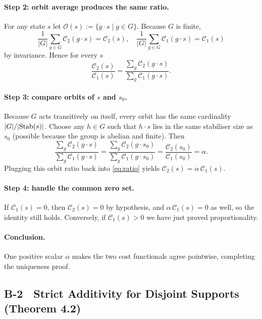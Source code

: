 \documentclass[11pt]{article}
\begin{document}
\paragraph{Step 2: orbit average produces the same ratio.}
For any state \(s\) let \(\mathcal{O}(s):=\{g\!\cdot\!s \mid g\in G\}\).  
Because \(G\) is finite,
\[
\frac{1}{|G|}\!\sum_{g\in G}\mathcal{C}_{2}(g\!\cdot\!s)
=
\mathcal{C}_{2}(s),
\quad
\frac{1}{|G|}\!\sum_{g\in G}\mathcal{C}_{1}(g\!\cdot\!s)
=
\mathcal{C}_{1}(s)
\]
by invariance.  Hence for every \(s\)
\begin{equation}
\label{eq:ratio}
\frac{\mathcal{C}_{2}(s)}{\mathcal{C}_{1}(s)}
=
\frac{\sum_{g}\mathcal{C}_{2}(g\!\cdot\!s)}
     {\sum_{g}\mathcal{C}_{1}(g\!\cdot\!s)}.
\end{equation}

\paragraph{Step 3: compare orbits of \(s\) and \(s_{0}\).}
Because \(G\) acts transitively on itself, every orbit has the same
cardinality \(|G|/|{\rm Stab}(s)|\).  
Choose any \(h\in G\) such that \(h\!\cdot\!s\) lies in the same
stabiliser size as \(s_{0}\) (possible because the group is abelian and
finite).  
Then
\[
\frac{\sum_{g}\mathcal{C}_{2}(g\!\cdot\!s)}
     {\sum_{g}\mathcal{C}_{1}(g\!\cdot\!s)}
=
\frac{\sum_{g}\mathcal{C}_{2}(g\!\cdot\!s_{0})}
     {\sum_{g}\mathcal{C}_{1}(g\!\cdot\!s_{0})}
=
\frac{\mathcal{C}_{2}(s_{0})}{\mathcal{C}_{1}(s_{0})}
=\alpha .
\]
Plugging this orbit ratio back into \eqref{eq:ratio} yields
\(\mathcal{C}_{2}(s)=\alpha\,\mathcal{C}_{1}(s)\).

\paragraph{Step 4: handle the common zero set.}
If \(\mathcal{C}_{1}(s)=0\), then \(\mathcal{C}_{2}(s)=0\) by hypothesis,
and \(\alpha\,\mathcal{C}_{1}(s)=0\) as well, so the identity still holds.
Conversely, if \(\mathcal{C}_{1}(s)>0\) we have just proved proportionality.

\paragraph{Conclusion.}
One positive scalar \(\alpha\) makes the two cost functionals agree
pointwise, completing the uniqueness proof.\qedhere

\subsection*{B-2 Strict Additivity for Disjoint Supports (Theorem 4.2)}
\label{app:additivity}
\end{document}
